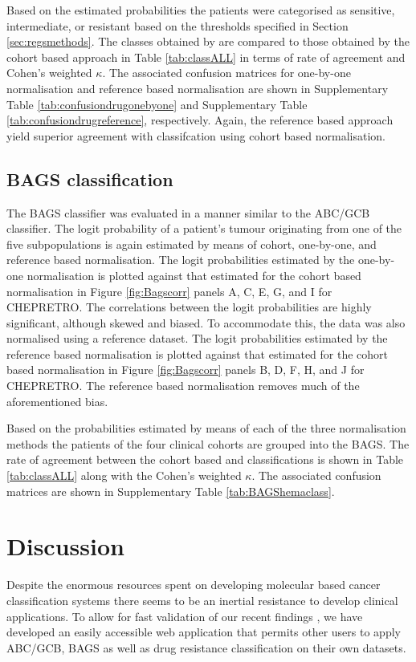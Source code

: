 \documentclass{article}
\begin{document}
Based on the estimated probabilities the patients were categorised as sensitive, intermediate, or resistant based on the thresholds specified in Section \ref{sec:regsmethods}.
The classes obtained by \hemaClass{} are compared to those obtained by the cohort based approach in Table \ref{tab:classALL} in terms of rate of agreement and Cohen's weighted $\kappa$.
The associated confusion matrices for one-by-one normalisation and reference based normalisation are shown in Supplementary Table \ref{tab:confusiondrugonebyone} and Supplementary Table \ref{tab:confusiondrugreference}, respectively.
Again, the reference based approach yield superior agreement with classifcation using cohort based normalisation.


\subsection{BAGS classification}
The BAGS classifier was evaluated in a manner similar to the ABC/GCB classifier.
The logit probability of a patient's tumour originating from one of the five subpopulations is again estimated by means of cohort, one-by-one, and reference based normalisation.
The logit probabilities estimated by the one-by-one normalisation is plotted against that estimated for the cohort based normalisation in Figure \ref{fig:Bagscorr} panels A, C, E, G, and I for CHEPRETRO.
The correlations between the logit probabilities are highly significant, although skewed and biased.
To accommodate this, the data was also normalised using a reference dataset.
The logit probabilities estimated by the reference based normalisation is plotted against that estimated for the cohort based normalisation in Figure \ref{fig:Bagscorr} panels B, D, F, H, and J for CHEPRETRO.
The reference based normalisation removes much of the aforementioned bias.

Based on the probabilities estimated by means of each of the three normalisation methods the patients of the four clinical cohorts are grouped into the BAGS.
The rate of agreement between the cohort based and \hemaClass{} classifications is shown in Table \ref{tab:classALL} along with the Cohen's weighted $\kappa$.
The associated confusion matrices are shown in Supplementary Table \ref{tab:BAGShemaclass}.




\section{Discussion}
Despite the enormous resources spent on developing molecular based cancer classification systems there seems to be an inertial resistance to develop clinical applications.
To allow for fast validation of our recent findings \citep{DybkaerBoegsted2015, Falgreen2015}, we have developed an easily accessible web application that permits other users to apply ABC/GCB, BAGS as well as drug resistance classification on their own datasets.
\end{document}
